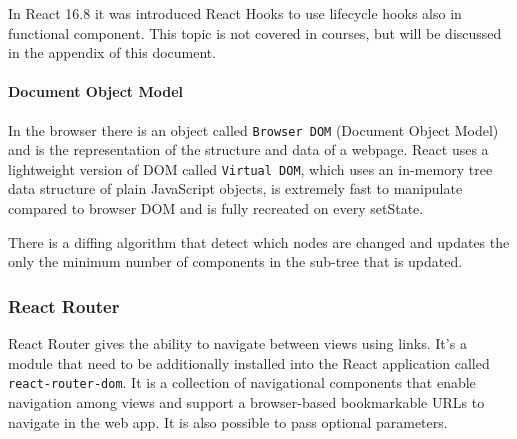 In React 16.8 it was introduced React Hooks to use lifecycle hooks also in functional component. This topic is not covered in courses, but will be discussed in the appendix of this document.

\paragraph*{Document Object Model}
In the browser there is an object called \texttt{Browser DOM} (Document Object Model) and is the representation of the structure and data of a webpage. React uses a lightweight version of DOM called \texttt{Virtual DOM}, which uses an in-memory tree data structure of plain JavaScript objects, is extremely fast to manipulate compared to browser DOM and is fully recreated on every setState. 

There is a diffing algorithm that detect which nodes are changed and updates the only the minimum number of components in the sub-tree that is updated.

\subsubsection*{React Router}
React Router gives the ability to navigate between views using links. It's a module that need to be additionally installed into the React application called \texttt{react-router-dom}. It is a collection of navigational components that enable navigation among views and support a browser-based bookmarkable URLs to navigate in the web app. It is also possible to pass optional parameters.
